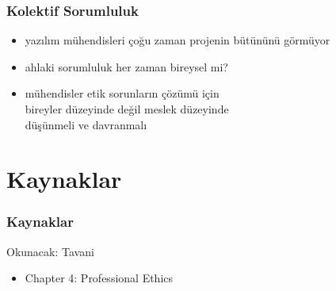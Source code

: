 \documentclass[dvipsnames]{beamer}
\theoremstyle{definition}
\theoremstyle{example}
\theoremstyle{plain}
\begin{document}
\begin{frame}
  \frametitle{Kolektif Sorumluluk}

  \begin{itemize}
    \item yazılım mühendisleri çoğu zaman projenin bütününü görmüyor

    \pause
    \item ahlaki sorumluluk her zaman bireysel mi?

    \pause
    \item mühendisler etik sorunların çözümü için\\
      bireyler düzeyinde değil meslek düzeyinde\\
      düşünmeli ve davranmalı
  \end{itemize}
\end{frame}

\section*{Kaynaklar}

\begin{frame}
  \frametitle{Kaynaklar}

  \begin{block}{Okunacak: Tavani}
    \begin{itemize}
      \item Chapter 4: \alert{Professional Ethics}
    \end{itemize}
  \end{block}
\end{frame}
\end{document}
